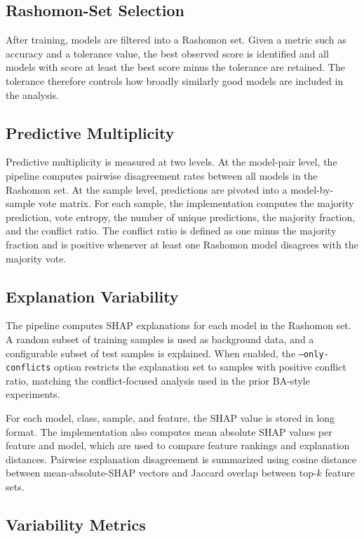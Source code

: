 \subsection{Rashomon-Set Selection}

After training, models are filtered into a Rashomon set. Given a metric such as accuracy and a tolerance value, the best observed score is identified and all models with score at least the best score minus the tolerance are retained. The tolerance therefore controls how broadly similarly good models are included in the analysis.

\subsection{Predictive Multiplicity}

Predictive multiplicity is measured at two levels. At the model-pair level, the pipeline computes pairwise disagreement rates between all models in the Rashomon set. At the sample level, predictions are pivoted into a model-by-sample vote matrix. For each sample, the implementation computes the majority prediction, vote entropy, the number of unique predictions, the majority fraction, and the conflict ratio. The conflict ratio is defined as one minus the majority fraction and is positive whenever at least one Rashomon model disagrees with the majority vote.

\subsection{Explanation Variability}

The pipeline computes \gls{SHAP} explanations for each model in the Rashomon set. A random subset of training samples is used as background data, and a configurable subset of test samples is explained. When enabled, the \texttt{--only-conflicts} option restricts the explanation set to samples with positive conflict ratio, matching the conflict-focused analysis used in the prior BA-style experiments.

For each model, class, sample, and feature, the \gls{SHAP} value is stored in long format. The implementation also computes mean absolute \gls{SHAP} values per feature and model, which are used to compare feature rankings and explanation distances. Pairwise explanation disagreement is summarized using cosine distance between mean-absolute-\gls{SHAP} vectors and Jaccard overlap between top-\(k\) feature sets.

\subsection{Variability Metrics}

